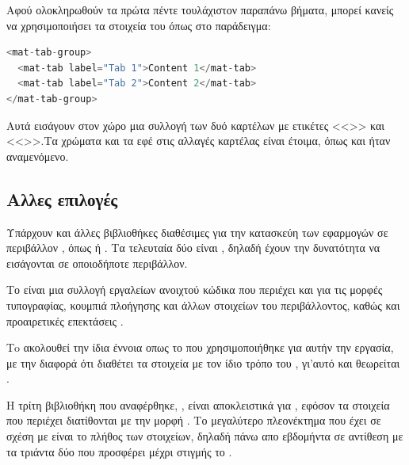 \quad Αφού ολοκληρωθούν τα πρώτα πέντε τουλάχιστον παραπάνω βήματα, μπορεί κανείς να χρησιμοποιήσει τα στοιχεία του  όπως στο παράδειγμα:
\begin{lstlisting}[language=JAVA]
<mat-tab-group>
  <mat-tab label="Tab 1">Content 1</mat-tab>
  <mat-tab label="Tab 2">Content 2</mat-tab>
</mat-tab-group>
\end{lstlisting}
Αυτά εισάγουν στον χώρο μια συλλογή των δυό καρτέλων με ετικέτες <<>> και <<>>.Τα χρώματα και τα εφέ στις αλλαγές καρτέλας είναι έτοιμα, όπως και ήταν αναμενόμενο.

\subsection*{Αλλες επιλογές}
\quad Υπάρχουν και άλλες βιβλιοθήκες διαθέσιμες για την κατασκεύη των εφαρμογών  σε περιβάλλον , όπως  ή . Τα τελευταία δύο είναι , δηλαδή έχουν την δυνατότητα να εισάγονται σε οποιοδήποτε περιβάλλον.\par Το  είναι μια συλλογή εργαλείων ανοιχτού κώδικα που περιέχει  και  για τις μορφές τυπογραφίας, κουμπιά πλοήγησης και άλλων στοιχείων του περιβάλλοντος, καθώς και προαιρετικές επεκτάσεις .\par
Τo  ακολουθεί την ίδια έννοια οπως το  που χρησιμοποιήθηκε για αυτήν την εργασία, με την διαφορά ότι διαθέτει τα στοιχεία με τον ίδιο τρόπο του , γι'αυτό και θεωρείται .\par
Η τρίτη βιβλιοθήκη που αναφέρθηκε, , είναι αποκλειστικά για , εφόσον τα στοιχεία που περιέχει διατίθονται με την μορφή . Το μεγαλύτερο πλεονέκτημα που έχει σε σχέση με  είναι το πλήθος των στοιχείων, δηλαδή πάνω απο εβδομήντα σε αντίθεση με τα τριάντα δύο που προσφέρει μέχρι στιγμής το .


